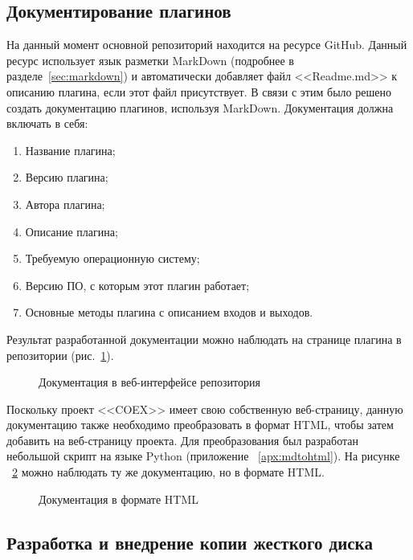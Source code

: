 \subsection{Документирование плагинов}

На данный момент основной репозиторий находится на ресурсе GitHub. Данный ресурс использует язык разметки MarkDown (подробнее в разделе~\ref{sec:markdown}) и автоматически добавляет файл <<Readme.md>> к описанию плагина, если этот файл присутствует. В связи с этим было решено создать документацию плагинов, используя MarkDown. Документация должна включать в себя:

\begin{enumerate}
  \item Название плагина;
  \item Версию плагина;
  \item Автора плагина;
  \item Описание плагина;
  \item Требуемую операционную систему;
  \item Версию ПО, с которым этот плагин работает;
  \item Основные методы плагина с описанием входов и выходов.
\end{enumerate}

Результат разработанной документации можно наблюдать на странице плагина в репозитории (рис.~\ref{bok_1:bok_1}).

\begin{figure}[h!]
\caption{ Документация в веб-интерфейсе репозитория }
\label{bok_1:bok_1}
\end{figure}

Поскольку проект <<COEX>> имеет свою собственную веб-страницу, данную документацию также необходимо преобразовать в формат HTML, чтобы затем добавить на веб-страницу проекта. Для преобразования был разработан небольшой скрипт на языке Python (приложение ~\ref{apx:mdtohtml}). На рисунке ~\ref{bok_2:bok_2} можно наблюдать ту же документацию, но в формате HTML.

\begin{figure}[h!]
\caption{ Документация в формате HTML }
\label{bok_2:bok_2}
\end{figure}

\clearpage
\subsection{Разработка и внедрение копии жесткого диска}

